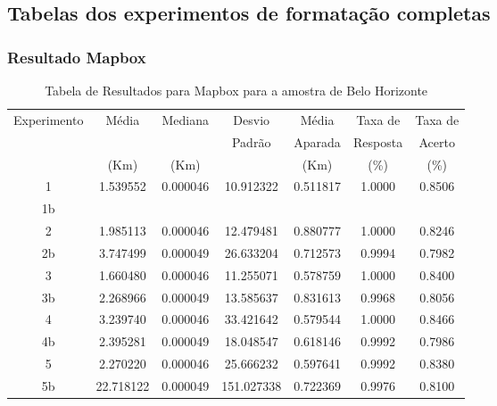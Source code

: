 
\begin{anexosenv}
\partanexos   %
\chapter{Tabelas dos experimentos de formatação completas}

\subsection{Resultado Mapbox}

\begin{table}[ht]
\centering
\begin{tabular}{|c|c|c|c|c|c|c|}
\hline
Experimento & Média & Mediana & Desvio & Média & Taxa de & Taxa de \\
 & & & Padrão & Aparada & Resposta & Acerto \\
 & (Km) & (Km) & & (Km) & (\%) & (\%) \\ \hline
1 & 1.539552 & 0.000046 & 10.912322 & 0.511817 & 1.0000 & 0.8506 \\ \hline
1b &  &  &  &  &  &  \\ \hline
2 & 1.985113 & 0.000046 & 12.479481 & 0.880777 & 1.0000 & 0.8246 \\ \hline
2b & 3.747499 & 0.000049 & 26.633204 & 0.712573 & 0.9994 & 0.7982 \\ \hline
3 & 1.660480 & 0.000046 & 11.255071 & 0.578759 & 1.0000 & 0.8400 \\ \hline
3b & 2.268966 & 0.000049 & 13.585637 & 0.831613 & 0.9968 & 0.8056 \\ \hline
4 & 3.239740 & 0.000046 & 33.421642 & 0.579544 & 1.0000 & 0.8466 \\ \hline
4b & 2.395281 & 0.000049 & 18.048547 & 0.618146 & 0.9992 & 0.7986 \\ \hline
5 & 2.270220 & 0.000046 & 25.666232 & 0.597641 & 0.9992 & 0.8380 \\ \hline
5b & 22.718122 & 0.000049 & 151.027338 & 0.722369 & 0.9976 & 0.8100 \\ \hline
\end{tabular}
\caption{Tabela de Resultados para Mapbox para a amostra de Belo Horizonte}
\label{tab:mapboxBH}
\end{table}


\end{anexosenv}
